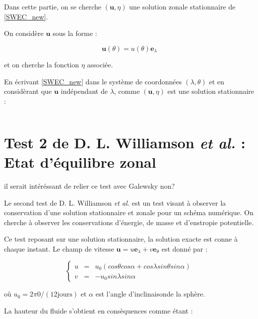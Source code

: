 Dans cette partie, on se cherche $(\mathbf{u}, \eta)$ une solution zonale stationnaire de \eqref{SWEC_new}.

On considère $\mathbf{u}$ sous la forme :

\begin{equation}
\mathbf{u}(\theta) = u(\theta) \mathbf{e}_{\lambda}
\end{equation}

et on cherche la fonction $\eta$ associée.

En écrivant \eqref{SWEC_new} dans le système de coordonnées $(\lambda, \theta)$ et en considèrant que $\mathbf{u}$ indépendant de $\lambda$, comme $(\mathbf{u}, \eta)$ est une solution stationnaire :

\begin{equation}

\end{equation}

\section{Test 2 de D. L. Williamson \textit{et al.} : Etat d'équilibre zonal}

\begin{com}
il serait intéréssant de relier ce test avec Galewsky non?
\end{com}

Le second test de D. L. Williamson \textit{et al.} \cite{Williamson1992} est un test visant à observer la conservation d'une solution stationnaire et zonale pour un schéma numérique. On cherche à observer les conservations d'énergie, de masse et d'enstropie potentielle.

Ce test reposant sur une solution stationnaire, la solution exacte est conne à chaque instant. Le champ de vitesse $\mathbf{u} = u \mathbf{e}_{\lambda} + v \mathbf{e}_{\theta}$ est donné par :

\begin{equation}
\left\lbrace
\begin{array}{rcl}
u & = & u_0 \left( cos \theta cos \alpha + cos \lambda sin \theta sin \alpha \right)\\
v & = & - u_0 sin \lambda sin \alpha
\end{array}
\right.
\label{eq:williamson2_u}
\end{equation}

où $u_0 = 2 \pi 0 / (12 \text{jours} )$ et $\alpha$ est l'angle d'inclinaisonde  la sphère.

La hauteur du fluide s'obtient en consèquences comme étant :

